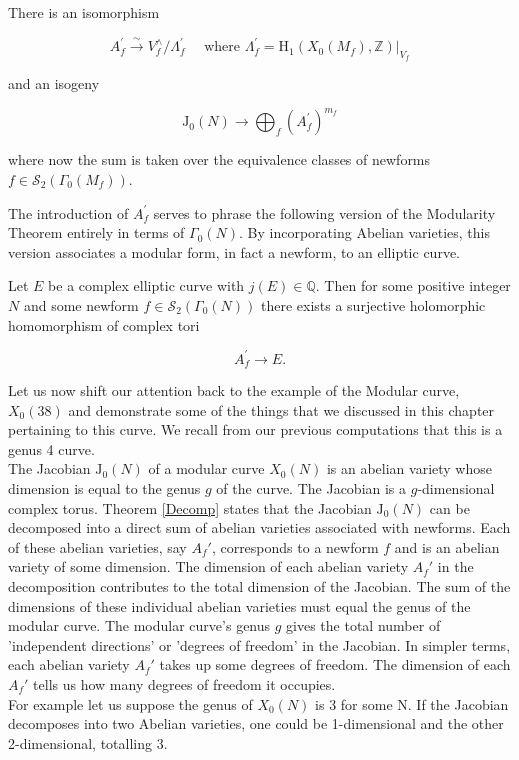 \begin{theorem}\label{Decomp}
    There is an isomorphism

\[ A_{f}^{\prime} \stackrel{\sim}{\longrightarrow} V_{f}^{\wedge} / \Lambda_{f}^{\prime} \quad \text { where } \Lambda_{f}^{\prime}=\left.\mathrm{H}_{1}\left(X_{0}\left(M_{f}\right), \mathbb{Z}\right)\right|_{V_{f}} \]

and an isogeny

\[ \mathrm{J}_{0}(N) \longrightarrow \bigoplus_{f}\left(A_{f}^{\prime}\right)^{m_{f}} \]

where now the sum is taken over the equivalence classes of newforms \(f \in \mathcal{S}_{2}\left(\Gamma_{0}\left(M_{f}\right)\right)\).
 \\
 
\end{theorem} 
 The introduction of \(A_{f}^{\prime}\) serves to phrase the following version of the Modularity Theorem entirely in terms of \(\Gamma_{0}(N)\). By incorporating Abelian varieties, this version associates a modular form, in fact a newform, to an elliptic curve. 

 \begin{theorem}
     Let $E$ be a complex elliptic curve with $j(E) \in \mathbb{Q}$. Then for some positive integer $N$ and some newform $f \in \mathcal{S}_{2}\left(\Gamma_{0}(N)\right)$ there exists a surjective holomorphic homomorphism of complex tori

$$
A_{f}^{\prime} \longrightarrow E.
$$

 \end{theorem}

 Let us now shift our attention back to the example of the Modular curve, $X_0(38)$ and demonstrate some of the things that we discussed in this chapter pertaining to this curve. We recall from our previous computations that this is a genus 4 curve. \\
 
The Jacobian \( \mathrm{J}_0(N) \) of a modular curve \( X_0(N) \) is an abelian variety whose dimension is equal to the genus \( g \) of the curve. The Jacobian is a \( g \)-dimensional complex torus. Theorem \ref{Decomp} states that the Jacobian \( \mathrm{J}_0(N) \) can be decomposed into a direct sum of abelian varieties associated with newforms. Each of these abelian varieties, say \( A_f' \), corresponds to a newform \( f \) and is an abelian variety of some dimension. The dimension of each abelian variety \( A_f' \) in the decomposition contributes to the total dimension of the Jacobian. The sum of the dimensions of these individual abelian varieties must equal the genus of the modular curve. The modular curve's genus \( g \) gives the total number of 'independent directions' or 'degrees of freedom' in the Jacobian. In simpler terms, each abelian variety \( A_f' \) takes up some degrees of freedom. The dimension of each \( A_f' \) tells us how many degrees of freedom it occupies. \\
For example let us suppose the genus of \( X_0(N) \) is 3 for some N. If the Jacobian decomposes into two Abelian varieties, one could be 1-dimensional and the other 2-dimensional, totalling 3.\\

